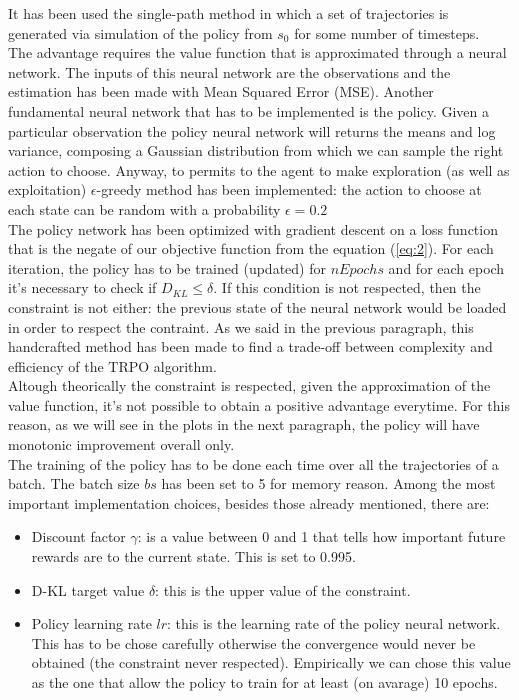 \documentclass[11pt]{article}
\begin{document}
It has been used the single-path method in which a set of trajectories is generated via
simulation of the policy from $s_0$ for some number of timesteps.
\\
The advantage requires the value function that is approximated through a neural network.
The inputs of this neural network are the observations and the estimation has been made
with Mean Squared Error (MSE). Another fundamental neural network that has to be
implemented is the policy. Given a particular observation the policy neural network will
returns the means and log variance, composing a Gaussian distribution from which we can
sample the right action to choose. Anyway, to permits to the agent to make exploration (as
well as exploitation) $\epsilon$-greedy method has been implemented: the action to choose
at each state can be random with a probability $\epsilon=0.2$ 
\\
The policy network has been optimized with gradient descent on a loss function that is the negate of
our objective function from the equation (\ref{eq:2}). For each iteration, the policy has
to be trained (updated) for $nEpochs$ and for each epoch it's necessary to check if
$D_{KL} \leq \delta$. If this condition is not respected, then the constraint is not
either: the previous state of the neural network would be loaded in order to respect the
contraint. As we said in the previous paragraph, this handcrafted method has been made to
find a trade-off between complexity and efficiency of the TRPO algorithm. \\
Altough theorically the constraint is respected, given the approximation of the value
function, it's not possible to obtain a positive advantage everytime. For this reason, as
we will see in the plots in the next paragraph, the policy will have monotonic improvement
overall only.
\\
The training of the policy has to be done each time over all the trajectories of a batch.
The batch size $bs$ has been set to 5 for memory reason.
Among the most important implementation choices, besides those already mentioned, there are:
\begin{itemize}
        \item Discount factor $\gamma$: is a value between 0 and 1 that tells how
        important future rewards are to the current state. This is set to 0.995.
        \item D-KL target value $\delta$: this is the upper value of the constraint.
        \item Policy learning rate $lr$: this is the learning rate of the policy neural
        network. This has to be chose carefully otherwise the convergence would never be
        obtained (the constraint never respected). Empirically we can chose this
        value as the one that allow the policy to train for at least (on avarage) 10 epochs.
\end{itemize}
\end{document}
